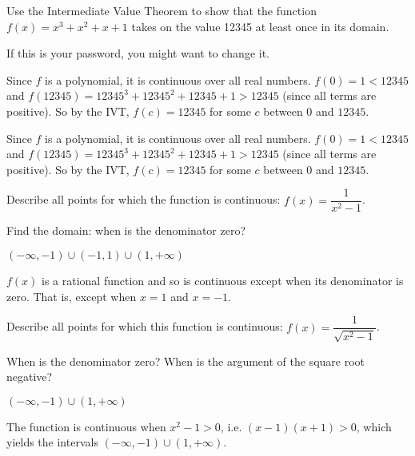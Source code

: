 \begin{question}Use the Intermediate Value Theorem to show that the function $f(x)=x^3+x^2+x+1$ takes on the value 12345 at least once in its domain.
\end{question}
\begin{hint} If this is your password, you might want to change it.
\end{hint}
\begin{answer} Since $f$ is a polynomial, it is continuous over all real numbers. $f(0)=1<12345$ and $f(12345)=12345^3+12345^2+12345+1>12345$ (since all terms are positive). So by the IVT, $f(c)=12345$ for some $c$ between $0$ and $12345$.
\end{answer}
\begin{solution} Since $f$ is a polynomial, it is continuous over all real numbers. $f(0)=1<12345$ and $f(12345)=12345^3+12345^2+12345+1>12345$ (since all terms are positive). So by the IVT, $f(c)=12345$ for some $c$ between $0$ and $12345$.
\end{solution}

\begin{question}[2015Q]
Describe all points for which the function is continuous: $f(x)=\dfrac{1}{x^2-1}$.
\end{question}
\begin{hint} Find the domain: when is the denominator zero?
\end{hint}
\begin{answer} $(-\infty, -1)\cup (-1,1) \cup (1,+\infty)$
\end{answer}
\begin{solution}
$f(x)$ is a rational function and so is continuous except when
        its denominator is zero. That is, except when $x=1$ and $x=-1$.
\end{solution}


\begin{Mquestion}[2015Q]
 Describe all points for which this function is continuous:
$f(x)=\dfrac{1}{\sqrt{x^2-1}}$.
\end{Mquestion}
\begin{hint}
When is the denominator zero? When is the argument of
         the square root negative?
\end{hint}
\begin{answer}
$(-\infty, -1)\cup (1,+\infty)$
\end{answer}
\begin{solution}
The function is continuous when $x^2-1> 0$, i.e. $(x-1)(x+1)> 0$, which yields the
intervals $(-\infty, -1)\cup (1,+\infty)$.
\end{solution}


